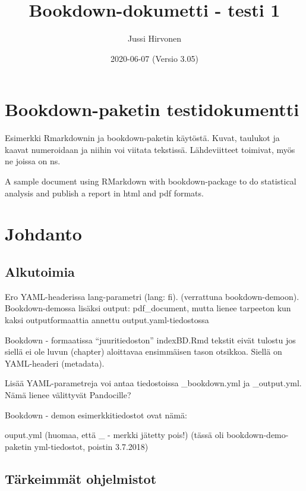 \documentclass[
  finnish,
]{book}
\title{Bookdown-dokumetti - testi 1}
\author{Jussi Hirvonen}
\date{2020-06-07 (Versio 3.05)}
\begin{document}
\maketitle

{
\setcounter{tocdepth}{1}
\tableofcontents
}
\hypertarget{bookdown-paketin-testidokumentti}{%
\chapter{Bookdown-paketin testidokumentti}\label{bookdown-paketin-testidokumentti}}

Esimerkki Rmarkdownin ja bookdown-paketin käytöstä. Kuvat, taulukot ja kaavat numeroidaan ja niihin voi viitata tekstissä. Lähdeviitteet toimivat, myös ne joissa on ns.

A sample document using RMarkdown with bookdown-package to do statistical analysis and publish a report in html and pdf formats.

\hypertarget{johdanto}{%
\chapter{Johdanto}\label{johdanto}}

\hypertarget{alkutoimia}{%
\section{Alkutoimia}\label{alkutoimia}}

Ero YAML-headerissa lang-parametri (lang: fi). (verrattuna bookdown-demoon).
Bookdown-demossa lisäksi output: pdf\_document, mutta lienee tarpeeton kun kaksi outputformaattia annettu output.yaml-tiedostossa

Bookdown - formaatissa ``juuritiedoston'' indexBD.Rmd tekstit eivät tulostu jos siellä ei ole luvun (chapter) aloittavaa ensimmäisen tason otsikkoa. Siellä on YAML-headeri (metadata).

Lisää YAML-parametreja voi antaa tiedostoissa \_bookdown.yml ja \_output.yml. Nämä lienee välittyvät Pandocille?

Bookdown - demon esimerkkitiedostot ovat nämä:

ouput.yml (huomaa, että \_ - merkki jätetty pois!) (tässä oli bookdown-demo-paketin yml-tiedostot, poistin 3.7.2018)

\hypertarget{tuxe4rkeimmuxe4t-ohjelmistot}{%
\section{Tärkeimmät ohjelmistot}\label{tuxe4rkeimmuxe4t-ohjelmistot}}
\end{document}
